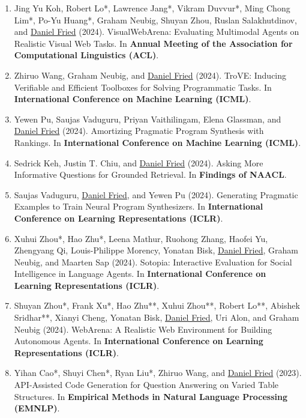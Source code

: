 \begin{enumerate}[leftmargin=-1mm,partopsep=0pt]
\item Jing Yu Koh, Robert Lo*, Lawrence Jang*, Vikram Duvvur*, Ming Chong Lim*, Po-Yu Huang*, Graham Neubig, Shuyan Zhou, Ruslan Salakhutdinov, and \underline{Daniel Fried} (2024). {VisualWebArena}: Evaluating Multimodal Agents on Realistic Visual Web Tasks. In \textbf{Annual Meeting of the Association for Computational Linguistics (ACL)}.

\item Zhiruo Wang, Graham Neubig, and \underline{Daniel Fried} (2024). {TroVE}: Inducing Verifiable and Efficient Toolboxes for Solving Programmatic Tasks. In \textbf{International Conference on Machine Learning (ICML)}.

\item Yewen Pu, Saujas Vaduguru, Priyan Vaithilingam, Elena Glassman, and \underline{Daniel Fried} (2024). Amortizing Pragmatic Program Synthesis with Rankings. In \textbf{International Conference on Machine Learning (ICML)}.

\item Sedrick Keh, Justin T. Chiu, and \underline{Daniel Fried} (2024). Asking More Informative Questions for Grounded Retrieval. In \textbf{Findings of NAACL}.

\item Saujas Vaduguru, \underline{Daniel Fried}, and Yewen Pu (2024). Generating Pragmatic Examples to Train Neural Program Synthesizers. In \textbf{International Conference on Learning Representations (ICLR)}.

\item Xuhui Zhou*, Hao Zhu*, Leena Mathur, Ruohong Zhang, Haofei Yu, Zhengyang Qi, Louis-Philippe Morency, Yonatan Bisk, \underline{Daniel Fried}, Graham Neubig, and Maarten Sap (2024). Sotopia: Interactive Evaluation for Social Intelligence in Language Agents. In \textbf{International Conference on Learning Representations (ICLR)}.

\item Shuyan Zhou*, Frank Xu*, Hao Zhu**, Xuhui Zhou**, Robert Lo**, Abishek Sridhar**, Xianyi Cheng, Yonatan Bisk, \underline{Daniel Fried}, Uri Alon, and Graham Neubig (2024). {WebArena}: A Realistic Web Environment for Building Autonomous Agents. In \textbf{International Conference on Learning Representations (ICLR)}.

\item Yihan Cao*, Shuyi Chen*, Ryan Liu*, Zhiruo Wang, and \underline{Daniel Fried} (2023). {API}-Assisted Code Generation for Question Answering on Varied Table Structures. In \textbf{Empirical Methods in Natural Language Processing (EMNLP)}.


\end{enumerate}
